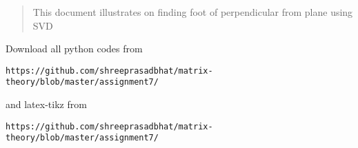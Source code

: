 \documentclass[journal,12pt,twocolumn]{IEEEtran}
\begin{document}
% 
\maketitle
\newpage
\bigskip
\renewcommand{\thefigure}{\theenumi}
\renewcommand{\thetable}{\theenumi}
%
%
\begin{abstract}
This document illustrates on finding foot of perpendicular from plane using SVD
\end{abstract}
Download all python codes from 
\begin{lstlisting}
https://github.com/shreeprasadbhat/matrix-theory/blob/master/assignment7/
\end{lstlisting}
and latex-tikz from
\begin{lstlisting}
https://github.com/shreeprasadbhat/matrix-theory/blob/master/assignment7/
\end{lstlisting}
%
\end{document}
